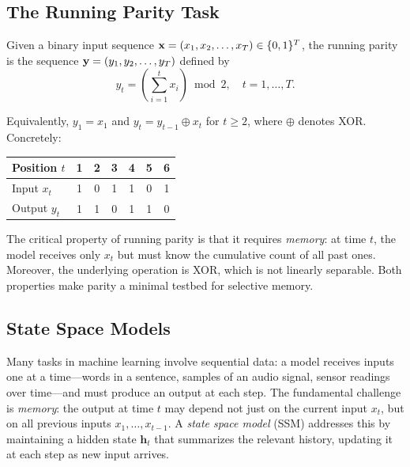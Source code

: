 \documentclass[11pt]{article}
\newcommand\hh{\mathbf{h}}
\begin{document}
\subsection{The Running Parity Task}
\label{sec:parity}

\begin{definition}
\label{def:parity}
Given a binary input sequence $\mathbf{x} = (x_1, x_2, \ldots, x_T) \in \{0,1\}^T$, the running parity is the sequence $\mathbf{y} = (y_1, y_2, \ldots, y_T)$ defined by
\begin{equation}
    y_t = \left(\sum_{i=1}^{t} x_i\right) \bmod 2, \quad t = 1, \ldots, T.
\end{equation}
\end{definition}

Equivalently, $y_1 = x_1$ and $y_t = y_{t-1} \oplus x_t$ for $t \geq 2$, where $\oplus$ denotes XOR.
Concretely:
\begin{center}
\begin{tabular}{lcccccc}
\toprule
Position $t$ & 1 & 2 & 3 & 4 & 5 & 6 \\
\midrule
Input $x_t$ & 1 & 0 & 1 & 1 & 0 & 1 \\
Output $y_t$ & 1 & 1 & 0 & 1 & 1 & 0 \\
\bottomrule
\end{tabular}
\end{center}

The critical property of running parity is that it requires \emph{memory}: at time $t$, the model receives only $x_t$ but must know the cumulative count of all past ones. Moreover, the underlying operation is XOR, which is not linearly separable. Both properties make parity a minimal testbed for selective memory.

\subsection{State Space Models}
\label{sec:ssm-background}

Many tasks in machine learning involve sequential data: a model receives inputs one at a time---words in a sentence, samples of an audio signal, sensor readings over time---and must produce an output at each step.
The fundamental challenge is \emph{memory}: the output at time $t$ may depend not just on the current input $x_t$, but on all previous inputs $x_1, \ldots, x_{t-1}$.
A \emph{state space model} (SSM) addresses this by maintaining a hidden state $\hh_t$ that summarizes the relevant history, updating it at each step as new input arrives.
\end{document}
